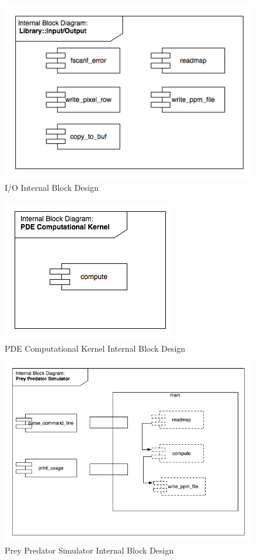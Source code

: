 \documentclass[12pt,a4paper]{article}
\begin{document}
\begin{figure}[hb]
    \centering
    \includegraphics[scale=0.6]{images/bd1.png}
    \caption{I/O Internal Block Design}
\end{figure}

\begin{figure}[hb]
    \centering
    \includegraphics[scale=0.6]{images/bd2.png}
    \caption{PDE Computational Kernel Internal Block Design}
\end{figure}

\begin{figure}[hb]
    \centering
    \includegraphics[scale=0.6]{images/bd3.png}
    \caption{Prey Predator Simulator Internal Block Design}
\end{figure}
\end{document}
